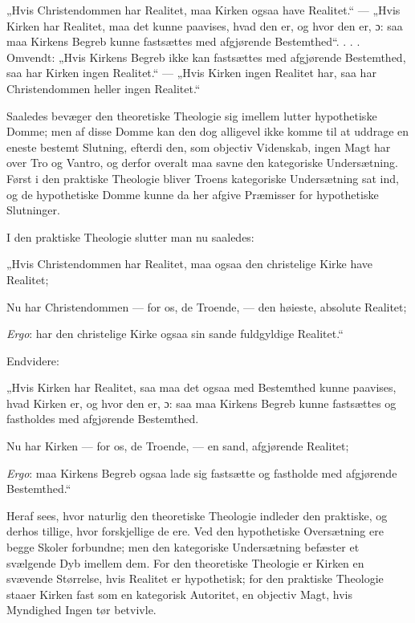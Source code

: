 \documentclass[12pt,a4paper]{book}
\newcommand{\opage}[1]{\marginnote{\footnotesize\textit{[#1]}}}
\begin{document}
„Hvis Christendommen har Realitet, maa Kirken ogsaa have Realitet.“ --- „Hvis
Kirken har Realitet, maa det kunne paavises, hvad den er, og hvor den er, ɔ: saa
maa Kirkens Begreb kunne fastsættes med afgjørende Bestemthed“. . . . Omvendt:
„Hvis Kirkens Begreb ikke kan fastsættes med afgjørende Bestemthed, saa har
Kirken ingen Realitet.“ --- „Hvis Kirken ingen Realitet har, saa har
Christendommen heller ingen Realitet.“

\opage{152} Saaledes bevæger den theoretiske Theologie sig imellem lutter hypothetiske
Domme; men af disse Domme kan den dog alligevel ikke komme til at uddrage en
eneste bestemt Slutning, efterdi den, som objectiv Videnskab, ingen Magt har
over Tro og Vantro, og derfor overalt maa savne den kategoriske Undersætning.
Først i den praktiske Theologie bliver Troens kategoriske Undersætning sat ind,
og de hypothetiske Domme kunne da her afgive Præmisser for hypothetiske
Slutninger.

I den praktiske Theologie slutter man nu saaledes:

„Hvis Christendommen har Realitet, maa ogsaa den christelige Kirke have
Realitet;

Nu har Christendommen --- for os, de Troende, --- den høieste, absolute
Realitet;

\emph{\textit{Ergo}}: har den christelige Kirke ogsaa sin sande fuldgyldige Realitet.“

Endvidere:

„Hvis Kirken har Realitet, saa maa det ogsaa med Bestemthed kunne paavises, hvad
Kirken er, og hvor den er, ɔ: saa maa Kirkens Begreb kunne fastsættes og
fastholdes med afgjørende Bestemthed.

Nu har Kirken --- for os, de Troende, --- en sand, afgjørende Realitet;

\emph{\textit{Ergo}}: maa Kirkens Begreb ogsaa lade sig fastsætte og fastholde med
afgjørende Bestemthed.“

Heraf sees, hvor naturlig den theoretiske Theologie indleder den praktiske, og
derhos tillige, hvor forskjellige de ere. Ved den hypothetiske Oversætning ere
begge Skoler forbundne; men den kategoriske Undersætning befæster et svælgende
Dyb imellem dem. For den theoretiske Theologie er Kirken en svævende Størrelse,
hvis Realitet er hypothetisk; for den praktiske Theologie staaer Kirken fast som
en kategorisk Autoritet, en objectiv Magt, hvis Myndighed Ingen tør betvivle.
\end{document}

